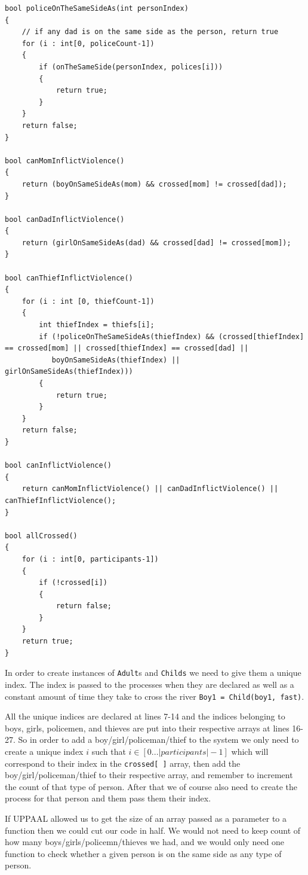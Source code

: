 \documentclass[a4paper,12pt]{article}
\begin{document}
\begin{lstlisting}[caption={Global declarations}]
bool policeOnTheSameSideAs(int personIndex)
{
    // if any dad is on the same side as the person, return true
    for (i : int[0, policeCount-1])
    {
        if (onTheSameSide(personIndex, polices[i]))
        {
            return true;
        }
    }
    return false;
}

bool canMomInflictViolence()
{
    return (boyOnSameSideAs(mom) && crossed[mom] != crossed[dad]);
}

bool canDadInflictViolence()
{
    return (girlOnSameSideAs(dad) && crossed[dad] != crossed[mom]);
}

bool canThiefInflictViolence()
{
    for (i : int [0, thiefCount-1])
    {
        int thiefIndex = thiefs[i];
        if (!policeOnTheSameSideAs(thiefIndex) && (crossed[thiefIndex] == crossed[mom] || crossed[thiefIndex] == crossed[dad] ||
           boyOnSameSideAs(thiefIndex) || girlOnSameSideAs(thiefIndex)))
        {
            return true;
        }
    }
    return false;
}

bool canInflictViolence()
{
    return canMomInflictViolence() || canDadInflictViolence() || canThiefInflictViolence();
}

bool allCrossed()
{
    for (i : int[0, participants-1])
    {
        if (!crossed[i])
        {
            return false;
        }
    }
    return true;
}
\end{lstlisting}

In order to create instances of \lstinline|Adult|s and \lstinline|Childs| we need to give them a unique index. The index is passed to the processes when they are declared as well as a constant amount of time they take to cross the river \lstinline|Boy1 = Child(boy1, fast)|.

All the unique indices are declared at lines 7-14 and the indices belonging to boys, girls, policemen, and thieves are put into their respective arrays at lines 16-27. So in order to add a boy/girl/policeman/thief to the system we only need to create a unique index $i$ such that $i \in [0 ... |participants|-1]$ which will correspond to their index in the \lstinline|crossed[ ]| array, then add the boy/girl/policeman/thief to their respective array, and remember to increment the count of that type of person. After that we of course also need to create the process for that person and them pass them their index.

If UPPAAL allowed us to get the size of an array passed as a parameter to a function then we could cut our code in half. We would not need to keep count of how many boys/girls/policemn/thieves we had, and we would only need one function to check whether a given person is on the same side as any type of person.
\end{document}
